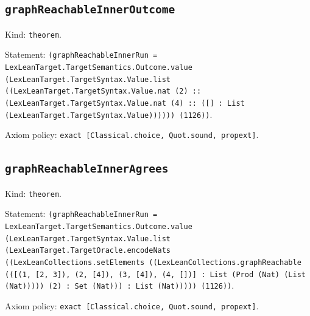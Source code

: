 \documentclass[11pt]{article}
\begin{document}
\subsection*{\texttt{graphReachableInnerOutcome}}
\noindent Kind: \texttt{theorem}.\par
\noindent Statement: \texttt{(graphReachableInnerRun = LexLeanTarget.TargetSemantics.Outcome.value (LexLeanTarget.TargetSyntax.Value.list ((LexLeanTarget.TargetSyntax.Value.nat (2) :: (LexLeanTarget.TargetSyntax.Value.nat (4) :: ([] : List (LexLeanTarget.TargetSyntax.Value)))))) (1126))}.\par
\noindent Axiom policy: \texttt{exact [Classical.choice, Quot.sound, propext]}.\par
\subsection*{\texttt{graphReachableInnerAgrees}}
\noindent Kind: \texttt{theorem}.\par
\noindent Statement: \texttt{(graphReachableInnerRun = LexLeanTarget.TargetSemantics.Outcome.value (LexLeanTarget.TargetSyntax.Value.list (LexLeanTarget.TargetOracle.encodeNats ((LexLeanCollections.setElements ((LexLeanCollections.graphReachable (([(1, [2, 3]), (2, [4]), (3, [4]), (4, [])] : List (Prod (Nat) (List (Nat))))) (2) : Set (Nat))) : List (Nat))))) (1126))}.\par
\noindent Axiom policy: \texttt{exact [Classical.choice, Quot.sound, propext]}.\par
\end{document}
